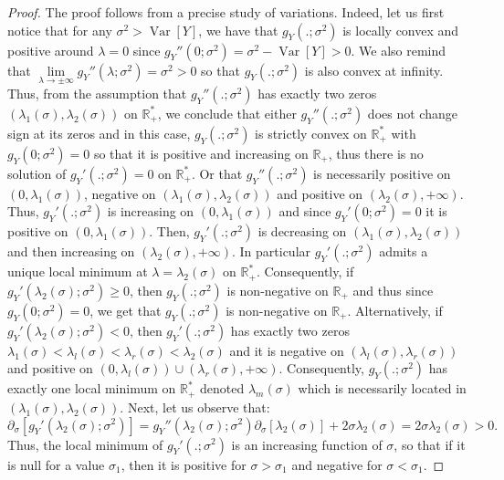 \documentclass[a4paper, 10pt]{article}
\newcommand{\beq}{\begin{equation}}
\newcommand{\eeq}{\end{equation}}
\theoremstyle{definition}
\begin{document}
\begin{proof}The proof follows from a precise study of variations. Indeed, let us first notice that for any $\sigma^2>\operatorname{Var}[Y]$, we have that $g_Y(.;\sigma^2)$ is locally convex and positive around $\lambda=0$ since $g_Y''(0;\sigma^2)=\sigma^2-\operatorname{Var}[Y]>0$. We also remind that $\underset{\lambda\to \pm \infty}{\lim} g_Y''(\lambda;\sigma^2)=\sigma^2>0$ so that $g_Y(.;\sigma^2)$ is also convex at infinity. Thus, from the assumption that $g_Y''(.;\sigma^2)$ has exactly two zeros $(\lambda_1(\sigma),\lambda_2(\sigma))$ on $\mathbb{R}_+^*$, we conclude that either $g_Y''(.;\sigma^2)$ does not change sign at its zeros and in this case, $g_Y(.;\sigma^2)$ is strictly convex on $\mathbb{R}_+^*$ with $g_Y(0;\sigma^2)=0$ so that it is positive and increasing on $\mathbb{R}_+$, thus there is no solution of $g_Y'(.;\sigma^2)=0$ on $\mathbb{R}_+^*$. Or that $g_Y''(.;\sigma^2)$ is necessarily positive on $(0,\lambda_1(\sigma))$, negative on $(\lambda_1(\sigma),\lambda_2(\sigma))$ and positive on $(\lambda_2(\sigma),+\infty)$. Thus, $g_Y'(.;\sigma^2)$ is increasing on $(0,\lambda_1(\sigma))$ and since $g_Y'(0;\sigma^2)=0$ it is positive on $(0,\lambda_1(\sigma))$. Then, $g_Y'(.;\sigma^2)$ is decreasing on $(\lambda_1(\sigma),\lambda_2(\sigma))$ and then increasing on $(\lambda_2(\sigma),+\infty)$. In particular $g_Y'(.;\sigma^2)$ admits a unique local minimum at $\lambda=\lambda_2(\sigma)$ on $\mathbb{R}_+^*$. Consequently, if $g_Y'(\lambda_2(\sigma);\sigma^2)\geq 0$, then $g_Y(.;\sigma^2)$ is non-negative on $\mathbb{R}_+$ and thus since $g_Y(0;\sigma^2)=0$, we get that $g_Y(.;\sigma^2)$ is non-negative on $\mathbb{R}_+$. Alternatively, if $g_Y'(\lambda_2(\sigma);\sigma^2)<0$, then $g_Y'(.;\sigma^2)$ has exactly two zeros $\lambda_1(\sigma)<\lambda_l(\sigma)<\lambda_r(\sigma)<\lambda_2(\sigma)$ and it is negative on $(\lambda_l(\sigma),\lambda_r(\sigma))$ and positive on $(0,\lambda_l(\sigma))\cup(\lambda_r(\sigma),+\infty)$. Consequently, $g_Y(.;\sigma^2)$ has exactly one local minimum on $\mathbb{R}_+^*$ denoted $\lambda_m(\sigma)$ which is necessarily located in  $(\lambda_1(\sigma),\lambda_2(\sigma))$.
Next, let us observe that:
\beq \partial_\sigma[g_Y'(\lambda_2(\sigma);\sigma^2)]=g_Y''(\lambda_2(\sigma);\sigma^2) \partial_\sigma[\lambda_2(\sigma)]+ 2\sigma\lambda_2(\sigma)=2\sigma\lambda_2(\sigma)>0.\eeq
Thus, the local minimum of $g_Y'(.;\sigma^2)$ is an increasing function of $\sigma$, so that if it is null for a value $\sigma_1$, then it is positive for $\sigma>\sigma_1$ and negative for $\sigma<\sigma_1$.

\end{proof}
\end{document}
